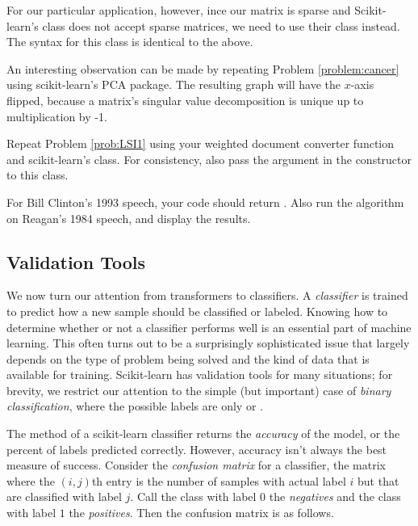 For our particular application, however, ince our matrix is sparse and Scikit-learn's  class does not accept sparse matrices, we need to use their  class instead.
The syntax for this class is identical to the above.

\begin{info}
An interesting observation can be made by repeating Problem \ref{problem:cancer} using scikit-learn's PCA package.
The resulting graph will have the $x$-axis flipped, because a matrix's singular value decomposition is unique up to multiplication by -1.
\end{info}

\begin{problem} %
Repeat Problem \ref{prob:LSI1} using your weighted document converter function and scikit-learn's  class.
For consistency, also pass the argument  in the constructor to this class.

For Bill Clinton's 1993 speech, your code should return .
Also run the algorithm on Reagan's 1984 speech, and display the results.
\end{problem}

\subsection*{Validation Tools} %

We now turn our attention from transformers to classifiers.
A \emph{classifier} is trained to predict how a new sample should be classified or labeled.
Knowing how to determine whether or not a classifier performs well is an essential part of machine learning.
This often turns out to be a surprisingly sophisticated issue that largely depends on the type of problem being solved and the kind of data that is available for training.
Scikit-learn has validation tools for many situations; for brevity, we restrict our attention to the simple (but important) case of \emph{binary classification}, where the possible labels are only  or .

The  method of a scikit-learn classifier returns the \emph{accuracy} of the model, or the percent of labels predicted correctly.
However, accuracy isn't always the best measure of success.
Consider the \emph{confusion matrix} for a classifier, the matrix where the $(i,j)$th entry is the number of samples with actual label $i$ but that are classified with label $j$.
Call the class with label $0$ the \emph{negatives} and the class with label $1$ the \emph{positives}.
Then the confusion matrix is as follows. 

